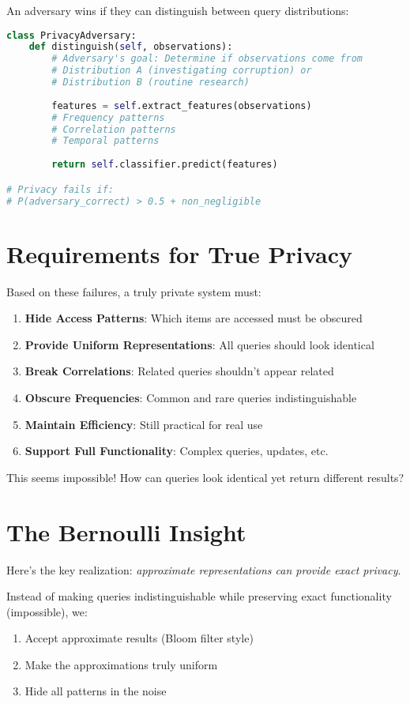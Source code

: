 An adversary wins if they can distinguish between query distributions:

\begin{lstlisting}[language=Python]
class PrivacyAdversary:
    def distinguish(self, observations):
        # Adversary's goal: Determine if observations come from
        # Distribution A (investigating corruption) or
        # Distribution B (routine research)
        
        features = self.extract_features(observations)
        # Frequency patterns
        # Correlation patterns  
        # Temporal patterns
        
        return self.classifier.predict(features)

# Privacy fails if:
# P(adversary_correct) > 0.5 + non_negligible
\end{lstlisting}

\section{Requirements for True Privacy}

Based on these failures, a truly private system must:

\begin{enumerate}
\item \textbf{Hide Access Patterns}: Which items are accessed must be obscured
\item \textbf{Provide Uniform Representations}: All queries should look identical
\item \textbf{Break Correlations}: Related queries shouldn't appear related
\item \textbf{Obscure Frequencies}: Common and rare queries indistinguishable
\item \textbf{Maintain Efficiency}: Still practical for real use
\item \textbf{Support Full Functionality}: Complex queries, updates, etc.
\end{enumerate}

This seems impossible! How can queries look identical yet return different results?

\section{The Bernoulli Insight}

Here's the key realization: \textit{approximate representations can provide exact privacy}.

Instead of making queries indistinguishable while preserving exact functionality (impossible), we:
\begin{enumerate}
\item Accept approximate results (Bloom filter style)
\item Make the approximations truly uniform
\item Hide all patterns in the noise
\end{enumerate}

